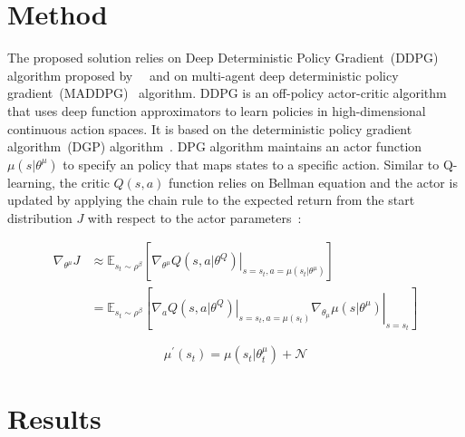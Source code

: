 \documentclass[12pt,english]{article}
\begin{document}
\section{Method}

The proposed solution relies on Deep Deterministic Policy Gradient~(DDPG) algorithm proposed by~\citeauthor{lillicrap:16}~\cite{lillicrap:16} and on multi-agent deep deterministic policy gradient~(MADDPG)~\cite{lowe:17} algorithm. DDPG is an off-policy actor-critic algorithm that uses deep function approximators to learn policies in high-dimensional continuous action spaces. It is based on the deterministic policy gradient algorithm~(DGP) algorithm~\citeauthor{silver:14}. DPG algorithm maintains an actor function \(\mu(s|\theta^\mu)\) to specify an policy that maps states to a specific action. Similar to Q-learning, the critic \(Q(s,a)\) function relies on Bellman equation and the actor is updated by applying the chain rule to the expected return from the start distribution \(J\) with respect to the actor parameters~\cite{lillicrap:16}:

\begin{equation*}
   \begin{aligned}
      \nabla_{\theta^{\mu}} J & \approx \mathbb{E}_{s_{t} \sim \rho^{\beta}}\left[\left.\nabla_{\theta^{\mu}} Q\left(s, a | \theta^{Q}\right)\right|_{s=s_{t}, a=\mu\left(s_{t} | \theta^{\mu}\right)}\right] \\&=\mathbb{E}_{s_{t} \sim \rho^{\beta}}\left[\left.\left.\nabla_{a} Q\left(s, a | \theta^{Q}\right)\right|_{s=s_{t}, a=\mu\left(s_{t}\right)} \nabla_{\theta_{\mu}} \mu\left(s | \theta^{\mu}\right)\right|_{s=s_{t}}\right]
   \end{aligned}
\end{equation*}


\begin{equation*}
\mu^{\prime}\left(s_{t}\right)=\mu\left(s_{t} | \theta_{t}^{\mu}\right)+\mathcal{N}
\end{equation*}

\section{Results}
\end{document}
